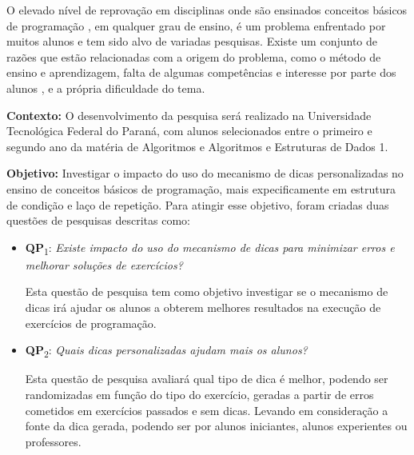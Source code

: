 \documentclass[12pt,english,brazil,a4paper,utf8,oneside]{utfpr-tcc}
\author{Gustavo Correia Gonzalez}  %
\title{} %
\begin{document}
	
\frontmatter
\maketitle

\begin{resumo}

O elevado nível de reprovação em disciplinas onde são ensinados conceitos básicos de programação \cite{Holcomb:2016:RCA:2839509.2851062}, em qualquer grau de ensino, é um problema enfrentado por muitos alunos e tem sido alvo de variadas pesquisas. Existe um conjunto de razões que estão relacionadas com a origem do problema, como o método de ensino e aprendizagem, falta de algumas competências e interesse por parte dos alunos \cite{Sinclair:2015:MSE:2729094.2742586}, e a própria dificuldade do tema.

\textbf{Contexto:} O desenvolvimento da pesquisa será realizado na Universidade Tecnológica Federal do Paraná, com alunos selecionados entre o primeiro e segundo ano da matéria de Algoritmos e Algoritmos e Estruturas de Dados 1.

\textbf{Objetivo:} Investigar o impacto do uso do mecanismo de dicas personalizadas no ensino de conceitos básicos de programação, mais expecificamente em estrutura de condição e laço de repetição. Para atingir esse objetivo, foram criadas duas questões de pesquisas descritas como:

\begin{itemize}
	\item \textbf{QP}\textsubscript{1}: 
	\textit{Existe impacto do uso do mecanismo de dicas para minimizar erros e melhorar soluções de exercícios?}
	
	Esta questão de pesquisa tem como objetivo investigar se o mecanismo de dicas irá ajudar os alunos a obterem melhores resultados na execução de exercícios de programação. 
	
	\item \textbf{QP}\textsubscript{2}: 
	\textit{Quais dicas personalizadas ajudam mais os alunos?}
	
	Esta questão de pesquisa avaliará qual tipo de dica é melhor, podendo ser randomizadas em função do tipo do exercício, geradas a partir de erros cometidos em exercícios passados e sem dicas. Levando em consideração a fonte da dica gerada, podendo ser por alunos iniciantes, alunos experientes ou professores.
	

\end{itemize}
\end{resumo}
\end{document}
